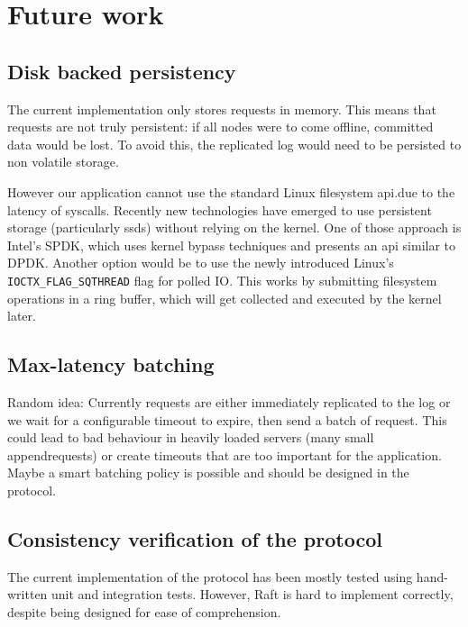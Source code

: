 \chapter{Future work}

\section{Disk backed persistency}

The current implementation only stores requests in memory.
This means that requests are not truly persistent: if all nodes were to come offline, committed data would be lost.
To avoid this, the replicated log would need to be persisted to non volatile storage.

However our application cannot use the standard Linux filesystem \gls{api}.due to the latency of syscalls.
Recently new technologies have emerged to use persistent storage (particularly \glspl{ssd}) without relying on the kernel.
One of those approach is Intel's SPDK\cite{spdk}, which uses kernel bypass techniques and presents an \gls{api} similar to DPDK.
Another option would be to use the newly introduced Linux's \texttt{IOCTX\_FLAG\_SQTHREAD} flag for polled IO.
This works by submitting filesystem operations in a ring buffer, which will get collected and executed by the kernel later.


\section{Max-latency batching}


Random idea: Currently requests are either immediately replicated to the log or we wait for a configurable timeout to expire, then send a batch of request.
This could lead to bad behaviour in heavily loaded servers (many small appendrequests) or create timeouts that are too important for the application.
Maybe a smart batching policy is possible and should be designed in the protocol.

\section{Consistency verification of the protocol}

The current implementation of the protocol has been mostly tested using hand-written unit and integration tests.
However, Raft is hard to implement correctly, despite being designed for ease of comprehension.


